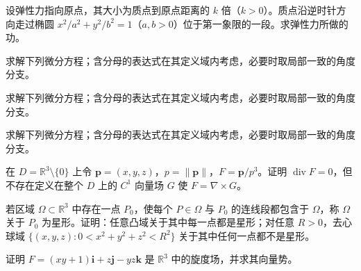 \newpage
\noindent\begin{minipage}{\textwidth}
设弹性力指向原点，其大小为质点到原点距离的 $k$ 倍（$k>0$）。质点沿逆时针方向走过椭圆 $x^2/a^2+y^2/b^2=1$（$a,b>0$）位于第一象限的一段。求弹性力所做的功。
\end{minipage}\par\vfill
\noindent\begin{minipage}{\textwidth}
求解下列微分方程；含分母的表达式在其定义域内考虑，必要时取局部一致的角度分支。
\end{minipage}\par\vfill
\noindent\begin{minipage}{\textwidth}
求解下列微分方程；含分母的表达式在其定义域内考虑，必要时取局部一致的角度分支。
\end{minipage}\par\vfill
\newpage
\noindent\begin{minipage}{\textwidth}
求解下列微分方程；含分母的表达式在其定义域内考虑，必要时取局部一致的角度分支。
\end{minipage}\par\vfill
\noindent\begin{minipage}{\textwidth}
在 $D=\mathbb R^3\setminus\{0\}$ 上令 $\mathbf p=(x,y,z)$，$p=\|\mathbf p\|$，$F=\mathbf p/p^3$。证明 $\operatorname{div}F=0$，但不存在定义在整个 $D$ 上的 $C^1$ 向量场 $G$ 使 $F=\nabla\times G$。
\end{minipage}\par\vfill
\noindent\begin{minipage}{\textwidth}
若区域 $\Omega\subset\mathbb R^3$ 中存在一点 $P_0$，使每个 $P\in\Omega$ 与 $P_0$ 的连线段都包含于 $\Omega$，称 $\Omega$ 关于 $P_0$ 为星形。证明：任意凸域关于其中每一点都是星形；对任意 $R>0$，去心球域 $\{(x,y,z):0<x^2+y^2+z^2<R^2\}$ 关于其中任何一点都不是星形。
\end{minipage}\par\vfill
\newpage
\noindent\begin{minipage}{\textwidth}
证明 $F=(xy+1)\mathbf i+z\mathbf j-yz\mathbf k$ 是 $\mathbb R^3$ 中的旋度场，并求其向量势。
\end{minipage}\par\vfill
